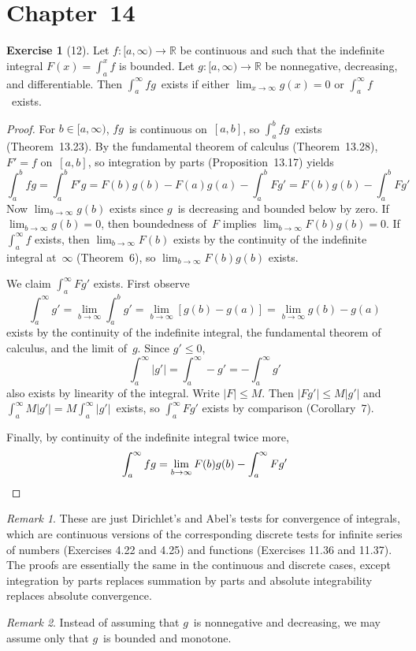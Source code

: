 \documentclass[letterpaper,12pt]{article}
\newcommand{\R}{\mathbb{R}}
\newcommand{\abs}[1]{|{#1}|}
\theoremstyle{plain}
\theoremstyle{definition}
\newtheorem*{exer}{Exercise}
\theoremstyle{remark}
\newtheorem*{rmk}{Remark}
\begin{document}
\section*{Chapter~14}
\begin{exer}[12]
Let \(f:[a,\infty)\to\R\) be continuous and such that the indefinite integral \(F(x)=\int_a^x f\) is bounded. Let \(g:[a,\infty)\to\R\) be nonnegative, decreasing, and differentiable. Then \(\int_a^{\infty}fg\)~exists if either \(\lim_{x\to\infty}g(x)=0\) or \(\int_a^{\infty}f\)~exists.
\end{exer}
\begin{proof}
For \(b\in[a,\infty)\), \(fg\)~is continuous on~\([a,b]\), so \(\int_a^b fg\)~exists (Theorem~13.23). By the fundamental theorem of calculus (Theorem~13.28), \(F'=f\) on~\([a,b]\), so integration by parts (Proposition~13.17) yields
\[\int_a^b fg=\int_a^b F'g=F(b)g(b)-F(a)g(a)-\int_a^b Fg'=F(b)g(b)-\int_a^b Fg'\]
Now \(\lim_{b\to\infty}g(b)\) exists since \(g\)~is decreasing and bounded below by zero. If \(\lim_{b\to\infty}g(b)=0\), then boundedness of~\(F\) implies \(\lim_{b\to\infty}F(b)g(b)=0\). If \(\int_a^\infty f\) exists, then \(\lim_{b\to\infty}F(b)\) exists by the continuity of the indefinite integral at~\(\infty\) (Theorem~6), so \(\lim_{b\to\infty}F(b)g(b)\) exists.

We claim \(\int_a^{\infty}Fg'\) exists. First observe
\[\int_a^{\infty}g'=\lim_{b\to\infty}\int_a^bg'=\lim_{b\to\infty}[g(b)-g(a)]=\lim_{b\to\infty}g(b)-g(a)\]
exists by the continuity of the indefinite integral, the fundamental theorem of calculus, and the limit of~\(g\). Since \(g'\le0\),
\[\int_a^{\infty}\abs{g'}=\int_a^{\infty}-g'=-\int_a^{\infty}g'\]
also exists by linearity of the integral. Write \(\abs{F}\le M\). Then \(\abs{Fg'}\le M\abs{g'}\) and \(\int_a^{\infty}M\abs{g'}=M\int_a^{\infty}\abs{g'}\)~exists, so \(\int_a^{\infty}Fg'\) exists by comparison (Corollary~7).

Finally, by continuity of the indefinite integral twice more,
\[\int_a^{\infty}fg=\lim_{b\to\infty}F(b)g(b)-\int_a^{\infty}Fg'\qedhere\]
\end{proof}
\begin{rmk}
These are just Dirichlet's and Abel's tests for convergence of integrals, which are continuous versions of the corresponding discrete tests for infinite series of numbers (Exercises 4.22 and 4.25) and functions (Exercises 11.36 and 11.37). The proofs are essentially the same in the continuous and discrete cases, except integration by parts replaces summation by parts and absolute integrability replaces absolute convergence.
\end{rmk}
\begin{rmk}
Instead of assuming that \(g\)~is nonnegative and decreasing, we may assume only that \(g\)~is bounded and monotone.
\end{rmk}
\end{document}
